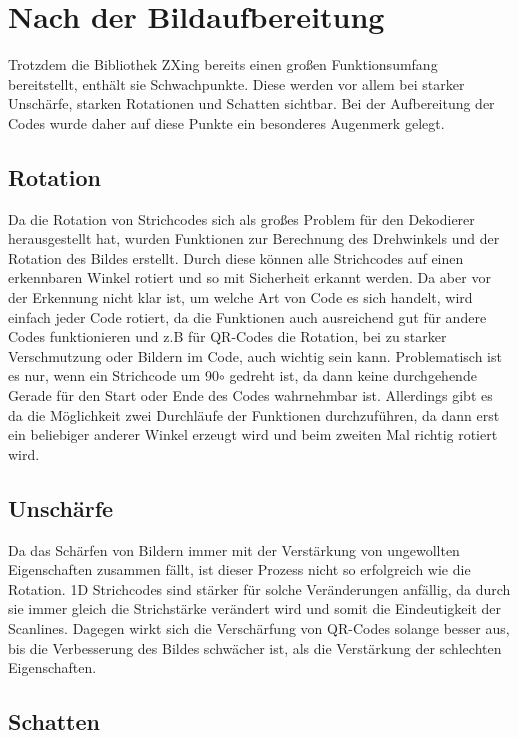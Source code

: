 \section{Nach der Bildaufbereitung}
\writtenby{\dcauthornameriren}%
Trotzdem die Bibliothek ZXing bereits einen großen Funktionsumfang bereitstellt, enthält sie Schwachpunkte. Diese werden vor allem bei starker Unschärfe, starken Rotationen und Schatten sichtbar.
Bei der Aufbereitung der Codes wurde daher auf diese Punkte ein besonderes Augenmerk gelegt.


\subsection*{Rotation}
Da die Rotation von Strichcodes sich als großes Problem für den Dekodierer herausgestellt hat, wurden Funktionen zur Berechnung des Drehwinkels und der Rotation des Bildes erstellt. Durch diese können alle Strichcodes auf einen erkennbaren Winkel rotiert und so mit Sicherheit erkannt werden.
Da aber vor der Erkennung nicht klar ist, um welche Art von Code es sich handelt, wird einfach jeder Code rotiert, da die Funktionen auch ausreichend gut für andere Codes funktionieren und z.B für QR-Codes die Rotation, bei zu starker Verschmutzung oder Bildern im Code, auch wichtig sein kann.
Problematisch ist es nur, wenn ein Strichcode um 90$ \circ $ gedreht ist, da dann keine durchgehende Gerade für den Start oder Ende des Codes wahrnehmbar ist. Allerdings gibt es da die Möglichkeit zwei Durchläufe der Funktionen durchzuführen, da dann erst ein beliebiger anderer Winkel erzeugt wird und beim zweiten Mal richtig rotiert wird.


\subsection*{Unschärfe}
Da das Schärfen von Bildern immer mit der Verstärkung von ungewollten Eigenschaften zusammen fällt, ist dieser Prozess nicht so erfolgreich wie die Rotation. 1D Strichcodes sind stärker für solche Veränderungen anfällig, da durch sie immer gleich die Strichstärke verändert wird und somit die Eindeutigkeit der Scanlines. Dagegen wirkt sich die Verschärfung von QR-Codes solange besser aus, bis die Verbesserung des Bildes schwächer ist, als die Verstärkung der schlechten Eigenschaften. 


\subsection*{Schatten}



